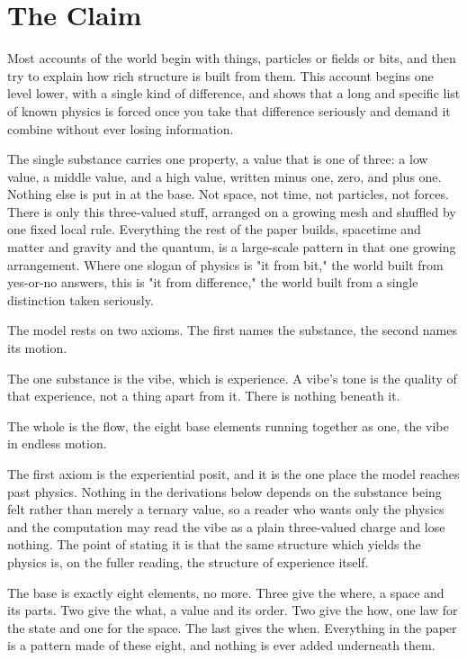 \section{The Claim}

Most accounts of the world begin with things, particles or fields or bits, and then try to explain how rich structure is built from them. This account begins one level lower, with a single kind of difference, and shows that a long and specific list of known physics is forced once you take that difference seriously and demand it combine without ever losing information.

The single substance carries one property, a value that is one of three: a low value, a middle value, and a high value, written minus one, zero, and plus one. Nothing else is put in at the base. Not space, not time, not particles, not forces. There is only this three-valued stuff, arranged on a growing mesh and shuffled by one fixed local rule. Everything the rest of the paper builds, spacetime and matter and gravity and the quantum, is a large-scale pattern in that one growing arrangement. Where one slogan of physics is "it from bit," the world built from yes-or-no answers, this is "it from difference," the world built from a single distinction taken seriously.

The model rests on two axioms. The first names the substance, the second names its motion.

\begin{axiom}
The one substance is the vibe, which is experience. A vibe's tone is the quality of that experience, not a thing apart from it. There is nothing beneath it.
\end{axiom}

\begin{axiom}
The whole is the flow, the eight base elements running together as one, the vibe in endless motion.
\end{axiom}

The first axiom is the experiential posit, and it is the one place the model reaches past physics. Nothing in the derivations below depends on the substance being felt rather than merely a ternary value, so a reader who wants only the physics and the computation may read the vibe as a plain three-valued charge and lose nothing. The point of stating it is that the same structure which yields the physics is, on the fuller reading, the structure of experience itself.

The base is exactly eight elements, no more. Three give the where, a space and its parts. Two give the what, a value and its order. Two give the how, one law for the state and one for the space. The last gives the when. Everything in the paper is a pattern made of these eight, and nothing is ever added underneath them.

